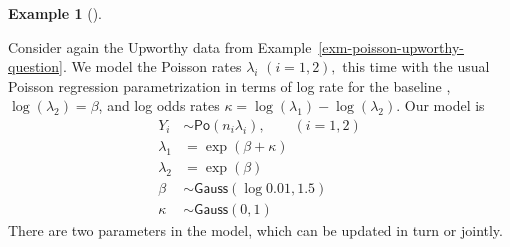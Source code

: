 \documentclass[
  11pt,
  letterpaper,
]{scrbook}
\theoremstyle{definition}
\theoremstyle{plain}
\theoremstyle{plain}
\theoremstyle{definition}
\newtheorem{example}{Example}[chapter]
\theoremstyle{definition}
\theoremstyle{remark}
\begin{document}
\begin{example}[]\protect\hypertarget{exm-upworthy-question}{}\label{exm-upworthy-question}

Consider again the Upworthy data from
Example~\ref{exm-poisson-upworthy-question}. We model the Poisson rates
\(\lambda_i\) \((i=1,2),\) this time with the usual Poisson regression
parametrization in terms of log rate for the baseline ,
\(\log(\lambda_2) = \beta\), and log odds rates
\(\kappa = \log(\lambda_1) - \log(\lambda_2)\). Our model is
\begin{align*}
Y_{i} &\sim \mathsf{Po}(n_i\lambda_i), \qquad (i=1,2)\\
\lambda_1 &= \exp(\beta + \kappa) \\
\lambda_2 &= \exp(\beta) \\
\beta & \sim \mathsf{Gauss}(\log 0.01, 1.5) \\
\kappa &\sim \mathsf{Gauss}(0, 1)
\end{align*} There are two parameters in the model, which can be updated
in turn or jointly.


\end{example}
\end{document}
